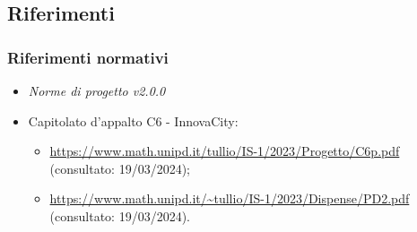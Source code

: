 \subsection{Riferimenti}

\subsubsection{Riferimenti normativi}
\begin{itemize}
    \item \textit{Norme di progetto v2.0.0}
    \item Capitolato d'appalto C6 - InnovaCity:
        \begin{itemize}
            \item \url{https://www.math.unipd.it/tullio/IS-1/2023/Progetto/C6p.pdf} (consultato: 19/03/2024);
            \item \url{https://www.math.unipd.it/~tullio/IS-1/2023/Dispense/PD2.pdf} (consultato: 19/03/2024).
        \end{itemize}
\end{itemize}

